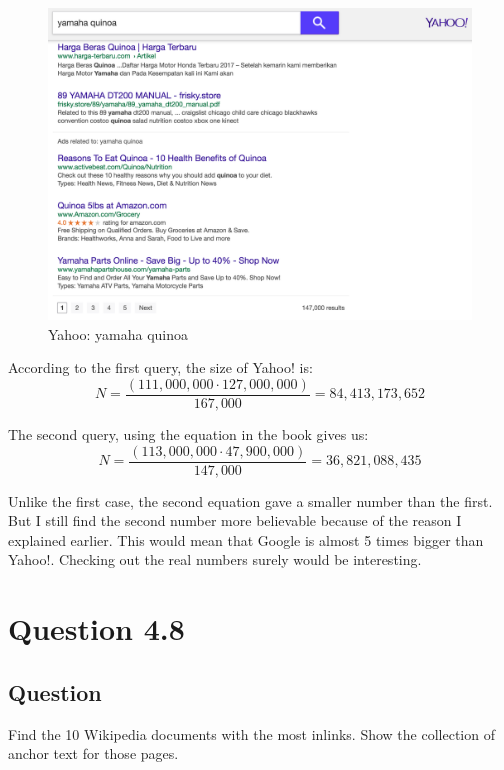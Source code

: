 \documentclass[10pt,letterpaper,bibliography=totoc]{scrartcl}
\begin{document}
\begin{figure}
\centering
\label{fig:yamahaQuinoaYahoo}
\includegraphics[scale=.3]{yamaha-quinoa_yahoo.png}
\caption{Yahoo: yamaha quinoa}
\end{figure}

According to the first query, the size of Yahoo! is:
\begin{equation}\label{eq:YahooSize1}
    N = \frac{(111,000,000 \cdot 127,000,000)}{167,000} = 84,413,173,652
\end{equation}

The second query, using the equation in the book gives us:
\begin{equation}\label{eq:YahooSize2}
    N = \frac{(113,000,000 \cdot 47,900,000)}{147,000} = 36,821,088,435
\end{equation}

Unlike the first case, the second equation gave a smaller number than the first. But I still find the second number more believable because of the reason I explained earlier. This would mean that Google is almost 5 times bigger than Yahoo!. Checking out the real numbers surely would be interesting. 

\section{Question 4.8}
\subsection {Question}
Find the 10 Wikipedia documents with the most inlinks. Show the collection of anchor text for those pages.
\end{document}
